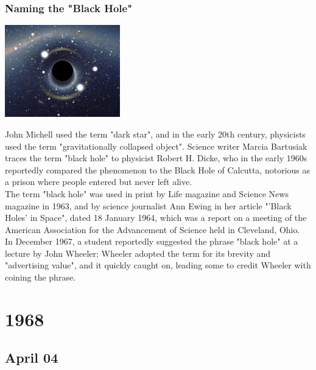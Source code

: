 \documentclass[11pt]{report}
\begin{document}
\subsection{Naming the "Black Hole"}
\vspace{2mm}\begin{center}\includegraphics[width=5cm]{./img/blackHole.jpg}\end{center}
John Michell used the term "dark star", and in the early 20th century, physicists used the term "gravitationally collapsed object". Science writer Marcia Bartusiak traces the term "black hole" to physicist Robert H. Dicke, who in the early 1960s reportedly compared the phenomenon to the Black Hole of Calcutta, notorious as a prison where people entered but never left alive.\\
\indent The term "black hole" was used in print by Life magazine and Science News magazine in 1963, and by science journalist Ann Ewing in her article "'Black Holes' in Space", dated 18 January 1964, which was a report on a meeting of the American Association for the Advancement of Science held in Cleveland, Ohio.\\
\indent In December 1967, a student reportedly suggested the phrase "black hole" at a lecture by John Wheeler; Wheeler adopted the term for its brevity and "advertising value", and it quickly caught on, leading some to credit Wheeler with coining the phrase.

\chapter{1968}
\section{April 04}
\end{document}

